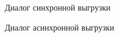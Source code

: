 \begin{figure}[H]
	\caption{Диалог синхронной выгрузки}
	\label{img:datatables:csv_sync}
\end{figure}

\begin{figure}[H]
	\caption{Диалог асинхронной выгрузки}
	\label{img:datatables:csv_async}
\end{figure}